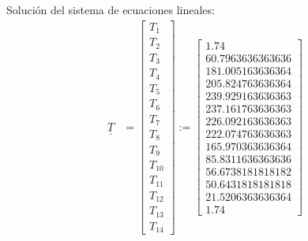 \documentclass[10pt]{article}
\def\doubleunderline#1{\underline{\underline{#1}}}
\begin{document}
Soluci\'on del sistema de ecuaciones lineales:
\begin{align*}
\doubleunderline{T} &= \left[\begin{matrix}T_{1}\\T_{2}\\T_{3}\\T_{4}\\T_{5}\\T_{6}\\T_{7}\\T_{8}\\T_{9}\\T_{10}\\T_{11}\\T_{12}\\T_{13}\\T_{14}\end{matrix}\right] := \left[\begin{matrix} 1.74 \\ 60.7963636363636\\181.005163636364\\205.824763636364\\239.929163636363\\237.161763636363\\226.092163636363\\222.074763636363\\165.970363636364\\85.8311636363636\\56.6738181818182\\50.6431818181818\\21.5206363636364 \\ 1.74 \end{matrix}\right]	
\end{align*}
\end{document}
